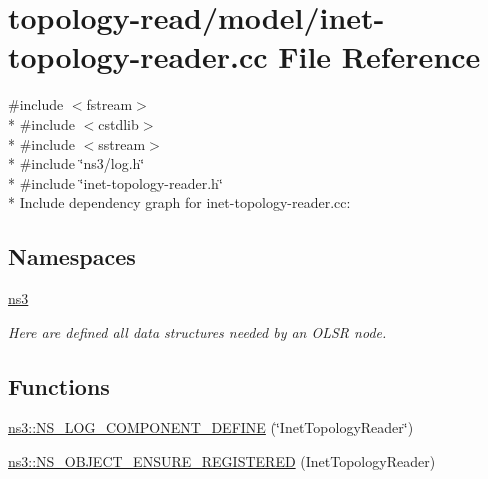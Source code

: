 \hypertarget{inet-topology-reader_8cc}{}\section{topology-\/read/model/inet-\/topology-\/reader.cc File Reference}
\label{inet-topology-reader_8cc}
{\ttfamily \#include $<$fstream$>$}\\*
{\ttfamily \#include $<$cstdlib$>$}\\*
{\ttfamily \#include $<$sstream$>$}\\*
{\ttfamily \#include \char`\"{}ns3/log.\+h\char`\"{}}\\*
{\ttfamily \#include \char`\"{}inet-\/topology-\/reader.\+h\char`\"{}}\\*
Include dependency graph for inet-\/topology-\/reader.cc\+:
\subsection*{Namespaces}
\begin{DoxyCompactItemize}
\item 
 \hyperlink{namespacens3}{ns3}
\begin{DoxyCompactList}\small\item\em Here are defined all data structures needed by an O\+L\+SR node. \end{DoxyCompactList}\end{DoxyCompactItemize}
\subsection*{Functions}
\begin{DoxyCompactItemize}
\item 
\hyperlink{namespacens3_acc45782ab3e4fe5b874c032c28673a97}{ns3\+::\+N\+S\+\_\+\+L\+O\+G\+\_\+\+C\+O\+M\+P\+O\+N\+E\+N\+T\+\_\+\+D\+E\+F\+I\+NE} (\char`\"{}Inet\+Topology\+Reader\char`\"{})
\item 
\hyperlink{namespacens3_abedc5b18696c6bef58d07fd8c7d99f71}{ns3\+::\+N\+S\+\_\+\+O\+B\+J\+E\+C\+T\+\_\+\+E\+N\+S\+U\+R\+E\+\_\+\+R\+E\+G\+I\+S\+T\+E\+R\+ED} (Inet\+Topology\+Reader)
\end{DoxyCompactItemize}
